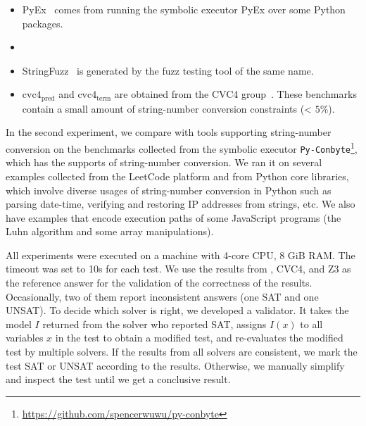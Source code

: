 \begin{itemize}
	\item PyEx~\cite{pyex} comes from running the symbolic executor PyEx over some Python packages.
	
	\smallskip
	
	
	
	


	\item {}
	
		\smallskip

	\item StringFuzz~\cite{blotsky2018stringfuzz}  is generated by the fuzz testing tool of the same name.
	
		\smallskip

	\item $\text{cvc4}_{\text{pred}}$ and $\text{cvc4}_{\text{term}}$ are obtained from the CVC4 group~\cite{termEQ}. These benchmarks contain a small amount of string-number conversion constraints (< $5\%$).
\end{itemize}

In the second experiment, we compare with tools supporting string-number conversion on the benchmarks collected from the symbolic executor \texttt{Py-Conbyte}\footnote{\url{https://github.com/spencerwuwu/py-conbyte}}, which has the supports of string-number conversion. We ran it on several examples collected from the LeetCode platform and from Python core libraries, which involve diverse usages of string-number conversion in Python such as parsing date-time, verifying and restoring IP addresses from strings, etc. We also have examples that encode execution paths of some JavaScript programs (the Luhn algorithm and some array manipulations).

All experiments were executed on a machine with 4-core CPU, 8 GiB RAM. The timeout was set to 10s for each test.
We use the results from {\tool}, CVC4, and Z3 as the reference answer for the validation of the correctness of the results. Occasionally, two of them report inconsistent  answers (one SAT and one UNSAT). To decide which solver is right, we developed a validator. It takes the model $I$ returned from the solver who reported SAT, assigns $I(x)$ to all variables $x$ in the test to obtain a modified test, and re-evaluates the modified test by multiple solvers. If the results from all solvers are consistent, we mark the test SAT or UNSAT according to the results. Otherwise, we manually simplify and inspect the test until we get a conclusive result. 

